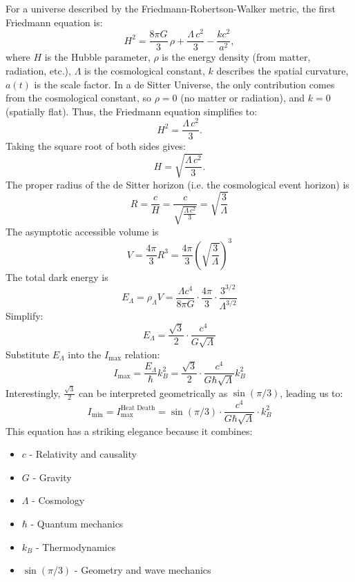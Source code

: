 \documentclass[12pt]{article}
\begin{document}
For a universe described by the Friedmann-Robertson-Walker metric, the first Friedmann equation is:
\begin{equation}
    H^2 = \frac{8\pi G}{3}\,\rho + \frac{\Lambda\, c^2}{3} - \frac{k c^2}{a^2},
\end{equation}
where \( H \) is the Hubble parameter, \( \rho \) is the energy density (from matter, radiation, etc.), \( \Lambda \) is the cosmological constant, \( k \) describes the spatial curvature, \( a(t) \) is the scale factor. In a de Sitter Universe, the only contribution comes from the cosmological constant, so \( \rho = 0 \) (no matter or radiation), and \( k = 0 \) (spatially flat). Thus, the Friedmann equation simplifies to:
\begin{equation}
H^2 = \frac{\Lambda\, c^2}{3}.
\end{equation}
Taking the square root of both sides gives:
\begin{equation}
H = \sqrt{\frac{\Lambda\, c^2}{3}}.
\end{equation}
The proper radius of the de Sitter horizon (i.e. the cosmological event horizon) is
\begin{equation}
    R = \frac{c}{H} = \frac{c}{\sqrt{\frac{\Lambda\, c^2}{3}}} = \sqrt{\frac{3}{\Lambda}}
\end{equation}
The asymptotic accessible volume is
\begin{equation}
    V = \frac{4 \pi}{3} R^3 = \frac{4 \pi}{3} (\sqrt{\frac{3}{\Lambda}})^3
\end{equation}
The total dark energy is
\begin{equation}
    E_\Lambda = \rho_\Lambda V = \frac{\Lambda c^4}{8 \pi G} \cdot \frac{4 \pi}{3} \cdot \frac{3^{3/2}}{\Lambda^{3/2}}
\end{equation}
Simplify:
\begin{equation}
    E_\Lambda = \frac{\sqrt{3}}{2} \cdot \frac{c^4}{G \sqrt{\Lambda}}
\end{equation}
Substitute $E_\Lambda$ into the $I_\text{max}$ relation:
\begin{equation}
    I_\text{max} = \frac{E_\Lambda}{\hbar} k_B^2  = \frac{\sqrt{3}}{2} \cdot \frac{c^4}{G \hbar \sqrt{\Lambda}} k_B^2
\end{equation}
Interestingly, $\frac{\sqrt{3}}{2}$ can be interpreted geometrically as $\sin(\pi / 3)$, leading us to:
\begin{equation}
    \boxed{I_\text{min} = I_\text{max}^{\text{Heat Death}} = \sin(\pi / 3) \cdot \frac{c^4}{G \hbar \sqrt{\Lambda}} \cdot k_B^2}
\end{equation}
This equation has a striking elegance because it combines:
\begin{itemize}
    \item $c$ - Relativity and causality
    \item $G$ - Gravity
    \item $\Lambda$ - Cosmology
    \item $\hbar$ - Quantum mechanics
    \item $k_B$ - Thermodynamics
    \item $\sin(\pi / 3)$ - Geometry and wave mechanics
\end{itemize}
\end{document}
